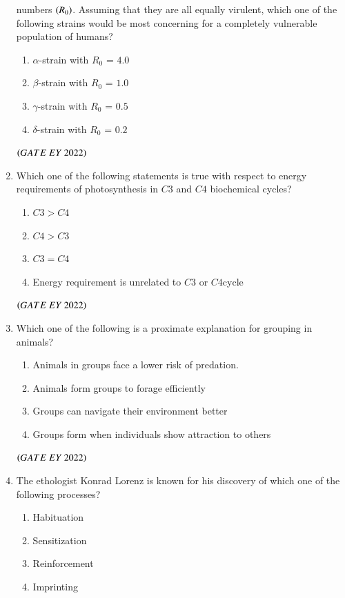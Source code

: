 \documentclass[journal]{IEEEtran}
\numberwithin{equation}{enumi}
\numberwithin{figure}{enumi}
\begin{document}
\begin{enumerate}
numbers $\left(R_0\right)$. Assuming that they are all equally virulent, which one of the
following strains would be most concerning for a completely vulnerable
population of humans?
    \begin{enumerate}
        \item  $\alpha$-strain with $R_0$ = $4.0$
        \item  $\beta$-strain with $R_0$ = $1.0$
        \item  $\gamma$-strain with $R_0$ = $0.5$
        \item  $\delta$-strain with $R_0$ = $0.2$
    \end{enumerate}
    \hfill{$\brak{ GATE\ EY\ 2022}$}
    \bigskip
 \item Which one of the following statements is true with respect to energy requirements
of photosynthesis in $C3$ and $C4$ biochemical cycles?
    \begin{enumerate}
        \item  $C3 > C4$
        \item  $C4 > C3$
        \item  $C3 = C4$
        \item  Energy requirement is unrelated to $C3$ or $C4$cycle
    \end{enumerate}
    \hfill{$\brak{ GATE\ EY\ 2022}$}
    \bigskip
 \item Which one of the following is a proximate explanation for grouping in animals?
    \begin{enumerate}
        \item  Animals in groups face a lower risk of predation.
        \item  Animals form groups to forage efficiently
        \item  Groups can navigate their environment better
        \item  Groups form when individuals show attraction to others
    \end{enumerate}
    \hfill{$\brak{ GATE\ EY\ 2022}$}
    \bigskip
 \item The ethologist Konrad Lorenz is known for his discovery of which one of the
following processes?
    \begin{enumerate}
        \item  Habituation
        \item  Sensitization
        \item  Reinforcement
        \item  Imprinting
    \end{enumerate}

\end{enumerate}
\end{document}
